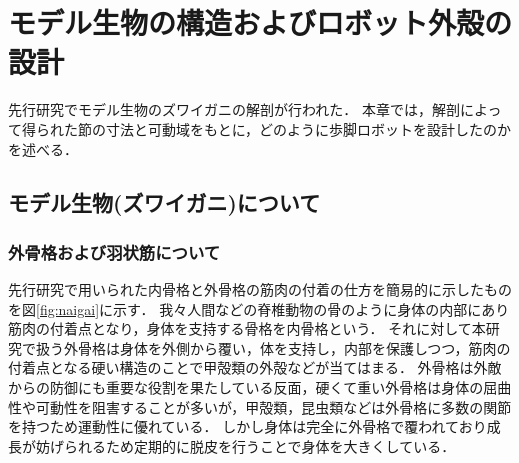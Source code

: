 \newpage
\section{モデル生物の構造およびロボット外殻の設計}
先行研究\cite{hasegawa}でモデル生物のズワイガニの解剖が行われた．
本章では，解剖によって得られた節の寸法と可動域をもとに，どのように歩脚ロボットを設計したのかを述べる．
\subsection{モデル生物(ズワイガニ)について}
\subsubsection{外骨格および羽状筋について}
先行研究\cite{hasegawa}で用いられた内骨格と外骨格の筋肉の付着の仕方を簡易的に示したものを図\ref{fig:naigai}に示す．
我々人間などの脊椎動物の骨のように身体の内部にあり筋肉の付着点となり，身体を支持する骨格を内骨格という．
それに対して本研究で扱う外骨格は身体を外側から覆い，体を支持し，内部を保護しつつ，筋肉の付着点となる硬い構造のことで甲殻類の外殻などが当てはまる．
外骨格は外敵からの防御にも重要な役割を果たしている反面，硬くて重い外骨格は身体の屈曲性や可動性を阻害することが多いが，甲殻類，昆虫類などは外骨格に多数の関節を持つため運動性に優れている．
しかし身体は完全に外骨格で覆われており成長が妨げられるため定期的に脱皮を行うことで身体を大きくしている．

